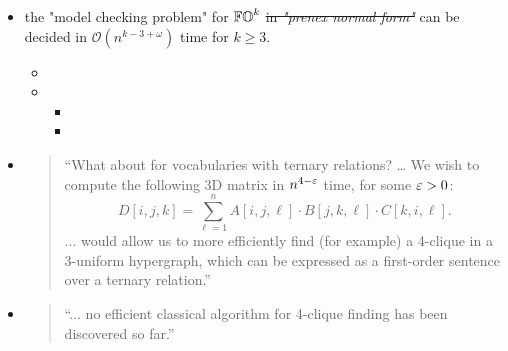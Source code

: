\begin{enumerate}
\begin{yoshiki}
\begin{itemize}
    \item the "model checking problem" for $\mathbb{FO}^{k}$  \sout{in \emph{"prenex normal form"}} can be decided in $\mathcal{O}(n^{k-3 + \omega})$ time for $k \ge 3$.
    \begin{itemize}
      \item {}
      \item {}
      \begin{itemize}
        \item {}
        \item {}
      \end{itemize}
    \end{itemize}
    \end{itemize}

    \begin{itemize}
      \item 
      \cite[Open Problem 2 (p.5)]{williamsFasterDecisionFirstorder2014}
      \begin{quotation}
        ``What about for vocabularies with ternary relations?
        \dots
        We wish to compute the following 3D matrix in $n^{4-\varepsilon}$ time,
        for some $\varepsilon > 0$:
      \[D[i, j, k] = \sum_{\ell = 1}^{n} A[i, j, \ell] \cdot B[j, k, \ell] \cdot C[k, i, \ell].\]
        ... would allow us to more efficiently find (for example) a 4-clique in a 3-uniform hypergraph,
        which can be expressed as a first-order sentence over a ternary relation.''
      \end{quotation}

      \item \cite{legallQuantumAlgorithmsFinding2016}
      \begin{quotation}
      ``... no efficient classical algorithm for 4-clique finding has been discovered
so far.'' 
      \end{quotation}


\end{itemize}
\end{yoshiki}
\end{enumerate}
